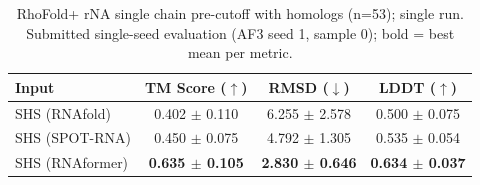 \begin{table}[htbp]
\centering
\caption{RhoFold+ rNA single chain pre-cutoff with homologs (n=53); single run. Submitted single-seed evaluation (AF3 seed 1, sample 0); bold = best mean per metric.}
\label{tab:rf_rna_single_chain_pre_cutoff_with_homologs}
\begin{tabular}{lccc}
\toprule
Input & TM Score ($\uparrow$) & RMSD ($\downarrow$) & LDDT ($\uparrow$) \\
\midrule
SHS (RNAfold) & 0.402 $\pm$ 0.110 & 6.255 $\pm$ 2.578 & 0.500 $\pm$ 0.075 \\
SHS (SPOT-RNA) & 0.450 $\pm$ 0.075 & 4.792 $\pm$ 1.305 & 0.535 $\pm$ 0.054 \\
SHS (RNAformer) & \textbf{0.635 $\pm$ 0.105} & \textbf{2.830 $\pm$ 0.646} & \textbf{0.634 $\pm$ 0.037} \\
\bottomrule
\end{tabular}
\end{table}
